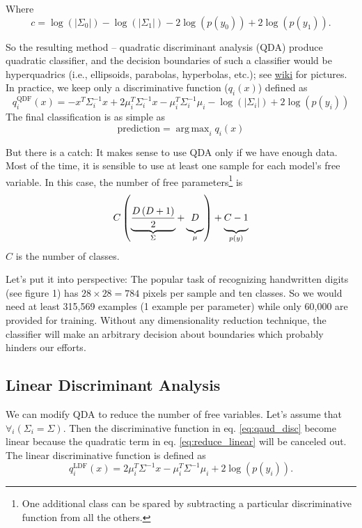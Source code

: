 \documentclass{article}
\DeclareMathOperator*{\argmax}{arg\,max}
\begin{document}
Where 
\begin{equation*}
    c = 
        \log{\left( |\Sigma_0| \right)}
        - \log{\left( |\Sigma_1| \right)}
        - 2\log{\left(p(y_0)  \right)}
        + 2\log{\left( p(y_1) \right)}.
\end{equation*}

So the resulting method -- quadratic discriminant analysis (QDA) produce quadratic classifier, 
and the decision boundaries of such a classifier would be
hyperquadrics (i.e., ellipsoids, parabolas, hyperbolas, etc.); see 
\href{https://en.wikipedia.org/wiki/Quadric#Euclidean_space}{wiki} for pictures. 
In practice, we keep only a discriminative function ($q_i(x)$) defined as
\begin{equation}
    \label{eq:qaud_disc}
    q^{\text{QDF}}_i(x) = 
        -x^T \Sigma_i^{-1} x 
        + 2\mu_i^T\Sigma_i^{-1} x
        -\mu_i^T\Sigma_i^{-1}\mu_i
        - \log{\left( |\Sigma_i| \right)}
        + 2\log{\left(p(y_i)  \right)}
\end{equation}
The final classification is as simple as
\begin{equation}
    \text{prediction} = \argmax_i q_i(x)
\end{equation}

But there is a catch: It makes sense to use QDA only if we have enough data. 
Most of the time, it is sensible to use at least one sample for each model’s free variable. 
In this case, the number of free parameters\footnote{One additional class can be spared by subtracting a particular discriminative function from all the others.}
is
$$
    C \left(
        \underbrace{\frac{D \left(D + 1\right)}{2}}_{\Sigma} 
        + 
        \underbrace{\vphantom{\frac{D \left(D + 1\right)}{2}}D}_{\mu} 
    \right) 
    +
    \underbrace{\vphantom{\frac{D \left(D + 1\right)}{2}}C - 1}_{p(y)}
$$ $C$ is the number of classes.

Let’s put it into perspective: The popular task of recognizing handwritten digits (see figure 1) has $28 \times 28 = 784$ pixels 
per sample and ten classes. So we would need at least 315,569 examples (1 example per parameter)
while only 60,000 are provided for training. Without any dimensionality reduction technique, the classifier
will make an arbitrary decision about boundaries which probably hinders our efforts.



\subsection{Linear Discriminant Analysis}
We can modify QDA to reduce the number of free variables. 
Let’s assume that $\forall_i (\Sigma_i = \Sigma)$. 
Then the discriminative function in eq. \ref{eq:qaud_disc} become linear because 
the quadratic term in eq. \ref{eq:reduce_linear} will be canceled out.
The linear discriminative function is defined as
\begin{equation}
    q^{\text{LDF}}_i(x) = 
        2\mu_i^T\Sigma^{-1}x
        - \mu_i^T\Sigma^{-1}\mu_i
        +2\log{\left(p(y_i)  \right)}.
\end{equation}
\end{document}
